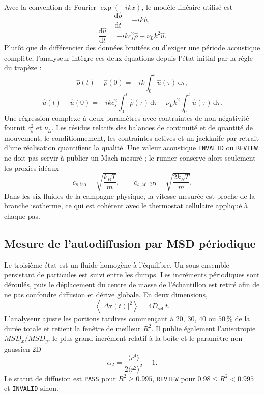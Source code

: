 \documentclass[11pt,a4paper]{article}
\begin{document}
Avec la convention de Fourier $\exp(-ikx)$, le modèle linéaire utilisé est
\begin{equation}
  \frac{\mathrm d\widehat\rho}{\mathrm dt}=-ik\widehat u,
\end{equation}
\begin{equation}
  \frac{\mathrm d\widehat u}{\mathrm dt}
  =-ikc_s^2\widehat\rho-\nu_Lk^2\widehat u.
\end{equation}
Plutôt que de différencier des données bruitées ou d'exiger une période acoustique complète, l'analyseur intègre ces deux équations depuis l'état initial par la règle du trapèze :
\begin{equation}
  \widehat\rho(t)-\widehat\rho(0)
  =-ik\int_0^t\widehat u(\tau)\,\mathrm d\tau,
\end{equation}
\begin{equation}
  \widehat u(t)-\widehat u(0)
  =-ikc_s^2\int_0^t\widehat\rho(\tau)\,\mathrm d\tau
  -\nu_Lk^2\int_0^t\widehat u(\tau)\,\mathrm d\tau.
\end{equation}
Une régression complexe à deux paramètres avec contraintes de non-négativité fournit $c_s^2$ et $\nu_L$. Les résidus relatifs des balances de continuité et de quantité de mouvement, le conditionnement, les contraintes actives et un jackknife par retrait d'une réalisation quantifient la qualité. Une valeur acoustique \texttt{INVALID} ou \texttt{REVIEW} ne doit pas servir à publier un Mach mesuré ; le runner conserve alors seulement les proxies idéaux
\begin{equation}
  c_{s,\mathrm{iso}}=\sqrt{\frac{k_BT}{m}},
  \qquad
  c_{s,\mathrm{ad},2D}=\sqrt{\frac{2k_BT}{m}}.
\end{equation}
Dans les six fluides de la campagne physique, la vitesse mesurée est proche de la branche isotherme, ce qui est cohérent avec le thermostat cellulaire appliqué à chaque pas.

\subsection{Mesure de l'autodiffusion par MSD périodique}

Le troisième état est un fluide homogène à l'équilibre. Un sous-ensemble persistant de particules est suivi entre les dumps. Les incréments périodiques sont déroulés, puis le déplacement du centre de masse de l'échantillon est retiré afin de ne pas confondre diffusion et dérive globale. En deux dimensions,
\begin{equation}
  \left\langle|\Delta\bm r(t)|^2\right\rangle=4D_{\mathrm{self}}t.
\end{equation}
L'analyseur ajuste les portions tardives commençant à $20$, $30$, $40$ ou $50\,\%$ de la durée totale et retient la fenêtre de meilleur $R^2$. Il publie également l'anisotropie $MSD_x/MSD_y$, le plus grand incrément relatif à la boîte et le paramètre non gaussien 2D
\begin{equation}
  \alpha_2=\frac{\langle r^4\rangle}{2\langle r^2\rangle^2}-1.
\end{equation}
Le statut de diffusion est \texttt{PASS} pour $R^2\geq0.995$, \texttt{REVIEW} pour $0.98\leq R^2<0.995$ et \texttt{INVALID} sinon.
\end{document}
